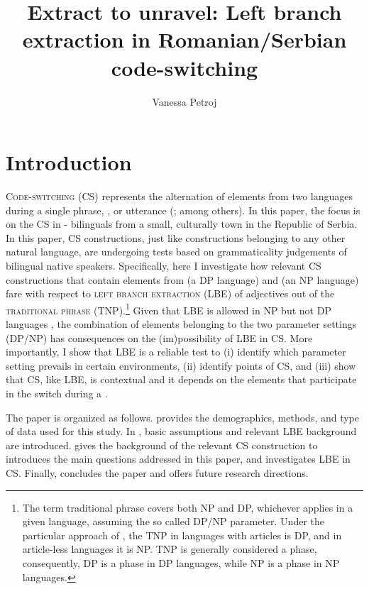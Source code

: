 \documentclass[output=paper,hidelinks,newtxmath,]{langscibook}
\title{Extract to unravel: Left branch extraction in Romanian/Serbian code-switching}
\author{Vanessa Petroj\affiliation{University of Connecticut}}
\begin{document}
\maketitle
{}

\section{Introduction}\label{15:s1}

\textsc{Code-switching} (CS) represents the alternation of elements from two languages during a single phrase, , or utterance (\citealt{Poplack1980,GonzalesVelasquez1995,MacSwan1999,Muysken2000}; among others). In this paper, the focus is on the CS in - bilinguals from a small, culturally  town in the Republic of Serbia. In this paper, CS constructions, just like constructions belonging to any other natural language, are undergoing tests based on grammaticality judgements of bilingual native speakers. Specifically, here I investigate how relevant CS constructions that contain elements from  (a DP language) and  (an NP language) fare with respect to \textsc{left branch extraction} (LBE) of adjectives out of the \textsc{traditional  phrase} (TNP).\footnote{\label{15:fn1}The term traditional  phrase covers both NP and DP, whichever applies in a given language, assuming the so called DP/NP parameter. Under the particular approach of \citet{Boskovic2014}, the TNP in languages with articles is DP, and in article-less languages it is NP. TNP is generally considered a phase, consequently, DP is a phase in DP languages, while NP is a phase in NP languages.} Given that LBE is allowed in NP but not DP languages \citep{Uriagereka1988,Boskovic2008,Boskovic2012}, the combination of elements belonging to the two parameter settings (DP/NP) has consequences on the (im)possibility of LBE in CS. More importantly, I show that LBE is a reliable test to (i) identify which parameter setting prevails in certain environments, (ii) identify points of CS, and (iii) show that CS, like LBE, is contextual and it depends on the elements that participate in the switch during a .

The paper is organized as follows.  provides the demographics, methods, and type of data used for this study. In , basic assumptions and relevant LBE background are introduced.  gives the background of the relevant CS construction to introduces the main questions addressed in this paper, and  investigates LBE in CS. Finally,  concludes the paper and offers future research directions.
\end{document}
